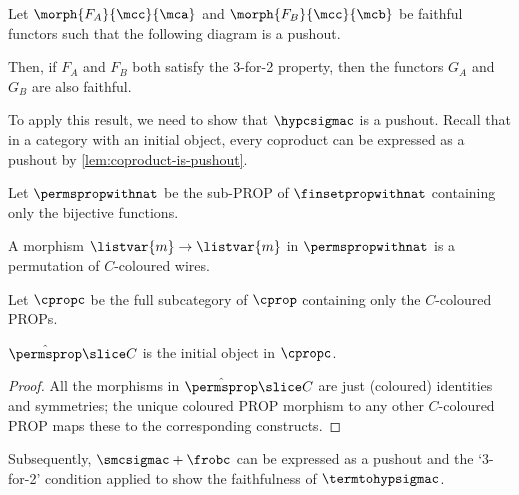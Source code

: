 \begin{theorem}
    \label{thm:faithful-pushout}
    Let \(\morph{F_A}{\mcc}{\mca}\) and \(\morph{F_B}{\mcc}{\mcb}\) be faithful
    functors such that the following diagram is a pushout.
    \begin{center}
        
    \end{center}
    Then, if \(F_A\) and \(F_B\) both satisfy the 3-for-2 property, then the
    functors \(G_A\) and \(G_B\) are also faithful.
\end{theorem}

To apply this result, we need to show that \(\hypcsigmac\) is a pushout.
Recall that in a category with an initial object, every coproduct can be
expressed as a pushout by \cref{lem:coproduct-is-pushout}.

\begin{definition}
    Let \(\permspropwithnat\) be the sub-PROP of \(\finsetpropwithnat\)
    containing only the bijective functions.
\end{definition}

A morphism \(\listvar{m} \to \listvar{m}\) in \(\permspropwithnat\) is a
permutation of \(C\)-coloured wires.

\begin{definition}
    Let \(\cpropc\) be the full subcategory of \(\cprop\) containing only the
    \(C\)-coloured PROPs.
\end{definition}

\begin{lemma}
    \label{cpropc-initial}
    \(\hat{\permsprop} \slice C\) is the initial object in \(\cpropc\).
\end{lemma}
\begin{proof}
    All the morphisms in \(\hat{\permsprop} \slice C\) are just (coloured)
    identities and symmetries; the unique coloured PROP morphism to any other
    \(C\)-coloured PROP maps these to the corresponding constructs.
\end{proof}

Subsequently, \(\smcsigmac + \frobc\) can be expressed as a pushout and the
`3-for-2' condition applied to show the faithfulness of \(\termtohypsigmac\).

